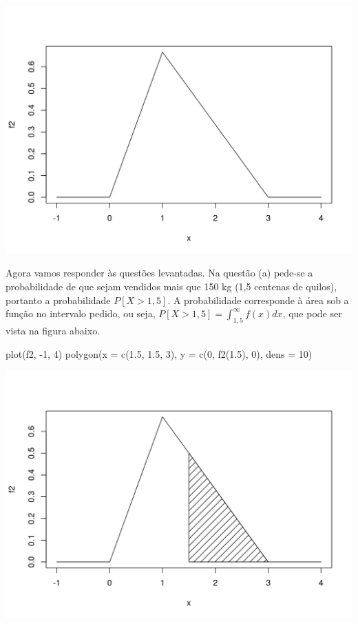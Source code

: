\documentclass[
  10pt,
  a4paper]{book}
\newenvironment{Shaded}{\begin{snugshade}}{\end{snugshade}}
\newcommand{\AttributeTok}[1]{\textcolor[rgb]{0.77,0.63,0.00}{#1}}
\newcommand{\DecValTok}[1]{\textcolor[rgb]{0.00,0.00,0.81}{#1}}
\newcommand{\FloatTok}[1]{\textcolor[rgb]{0.00,0.00,0.81}{#1}}
\newcommand{\FunctionTok}[1]{\textcolor[rgb]{0.00,0.00,0.00}{#1}}
\newcommand{\NormalTok}[1]{#1}
\newcommand{\SpecialCharTok}[1]{\textcolor[rgb]{0.00,0.00,0.00}{#1}}
\begin{document}
\begin{center}\includegraphics{figures/unnamed-chunk-332-1} \end{center}

Agora vamos responder às questões levantadas. Na questão (a) pede-se a
probabilidade de que sejam vendidos mais que 150 kg (1,5 centenas de
quilos), portanto a probabilidade \(P[X > 1,5]\). A probabilidade
corresponde à área sob a função no intervalo pedido, ou seja,
\(P[X > 1,5] = \int_{1,5}^\infty f(x) dx\), que pode ser vista na figura
abaixo.

\begin{Shaded}
\begin{Highlighting}[]
\FunctionTok{plot}\NormalTok{(f2, }\SpecialCharTok{{-}}\DecValTok{1}\NormalTok{, }\DecValTok{4}\NormalTok{)}
\FunctionTok{polygon}\NormalTok{(}\AttributeTok{x =} \FunctionTok{c}\NormalTok{(}\FloatTok{1.5}\NormalTok{, }\FloatTok{1.5}\NormalTok{, }\DecValTok{3}\NormalTok{), }\AttributeTok{y =} \FunctionTok{c}\NormalTok{(}\DecValTok{0}\NormalTok{, }\FunctionTok{f2}\NormalTok{(}\FloatTok{1.5}\NormalTok{), }\DecValTok{0}\NormalTok{), }\AttributeTok{dens =} \DecValTok{10}\NormalTok{)}
\end{Highlighting}
\end{Shaded}

\begin{center}\includegraphics{figures/unnamed-chunk-333-1} \end{center}
\end{document}
